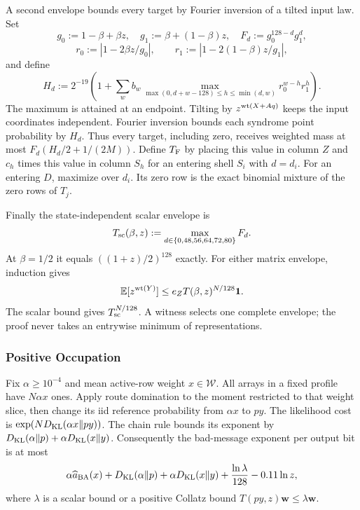 A second envelope bounds every target by Fourier inversion of a tilted
input law. Set
\[
 g_0:=1-\beta+\beta z,\quad g_1:=\beta+(1-\beta)z,\quad
 F_d:=g_0^{128-d}g_1^d,
\]
\[
 r_0:=|1-2\beta z/g_0|,\qquad
 r_1:=|1-2(1-\beta)z/g_1|,
\]
and define
\[
 H_d:=2^{-19}\left(1+\sum_w b_w
 \max_{\max(0,d+w-128)\le h\le\min(d,w)}r_0^{w-h}r_1^h\right).
\]
The maximum is attained at an endpoint. Tilting by $z^{\operatorname{wt}(X+Aq)}$ keeps
the input coordinates independent. Fourier inversion bounds each syndrome
point probability by $H_d$. Thus every target, including zero, receives
weighted mass at most $F_d(H_d/2+1/(2M))$. Define $T_{\rm F}$ by placing
this value in column $Z$ and $c_h$ times this value in column $S_h$ for an
entering shell $S_i$ with $d=d_i$. For an entering $D$, maximize over $d_i$.
Its zero row is the exact binomial mixture of the zero rows of $T_j$.

Finally the state-independent scalar envelope is
\[
 T_{\rm sc}(\beta,z):=\max_{d\in\{0,48,56,64,72,80\}}F_d.
\]
At $\beta=1/2$ it equals $((1+z)/2)^{128}$ exactly. For either matrix
envelope, induction gives
\begin{equation}
 \mathbb E[z^{\operatorname{wt}(Y)}]\le e_Z T(\beta,z)^{N/128}\mathbf 1.
 \label{eq:imt-moment}
\end{equation}
The scalar bound gives $T_{\rm sc}^{N/128}$. A witness selects one complete
envelope; the proof never takes an entrywise minimum of representations.

\subsubsection{Positive Occupation}

Fix $\alpha\ge10^{-4}$ and mean active-row weight $x\in\mathcal W$.
All arrays in a fixed profile have $N\alpha x$ ones. Apply route domination
to the moment restricted to that weight slice, then change its iid reference
probability from $\alpha x$ to $py$. The likelihood cost is
$\exp(ND_{\rm KL}(\alpha x\Vert py))$. The chain rule bounds its exponent by
$D_{\rm KL}(\alpha\Vert p)+\alpha D_{\rm KL}(x\Vert y)$.
Consequently the bad-message exponent per output bit is at most
\begin{equation}
 \alpha\widehat a_{\rm BA}(x)+D_{\rm KL}(\alpha\Vert p)
 +\alpha D_{\rm KL}(x\Vert y)+\frac{\ln\lambda}{128}-0.11\ln z,
 \label{eq:imt-dense-exponent}
\end{equation}
where $\lambda$ is a scalar bound or a positive Collatz bound
$T(py,z)\boldsymbol w\le\lambda\boldsymbol w$.

